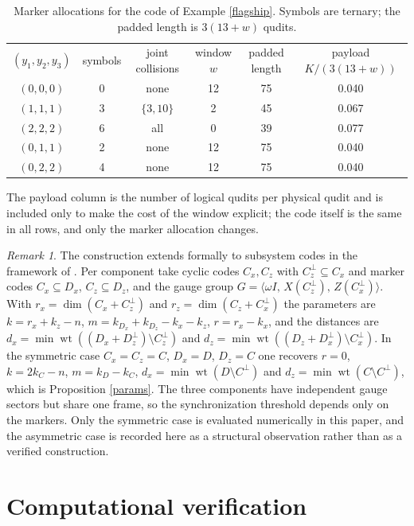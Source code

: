 \documentclass[11pt,reqno]{amsart}
\theoremstyle{definition}
\theoremstyle{remark}
\newtheorem{remark}[theorem]{Remark}
\newcommand{\wt}{\operatorname{wt}}
\newcommand{\gen}[1]{\langle #1\rangle}
\begin{document}
\begin{table}[t]
\centering
\caption{Marker allocations for the code of Example \ref{flagship}. Symbols are ternary; the padded length is $3(13+w)$ qudits.\label{tab:alloc}}
\small
\begin{tabular}{cccccc}
\toprule
$(y_1,y_2,y_3)$ & symbols & joint collisions & window $w$ & padded length & payload $K/(3(13+w))$ \\
$(0,0,0)$ & 0 & none & 12 & 75 & 0.040 \\
$(1,1,1)$ & 3 & $\{3,10\}$ & 2 & 45 & 0.067 \\
$(2,2,2)$ & 6 & all & 0 & 39 & 0.077 \\
$(0,1,1)$ & 2 & none & 12 & 75 & 0.040 \\
$(0,2,2)$ & 4 & none & 12 & 75 & 0.040 \\
\bottomrule
\end{tabular}

\smallskip
\parbox{\linewidth}{\footnotesize The payload column is the number of logical qudits per physical qudit and is included only to make the cost of the window explicit; the code itself is the same in all rows, and only the marker allocation changes.}
\end{table}

\begin{remark}\label{subsystem}
The construction extends formally to subsystem codes in the framework of \cite{TansuwannontNemec2026}. Per component take cyclic codes $C_x,C_z$ with $C_z^\perp\subseteq C_x$ and marker codes $C_x\subseteq D_x$, $C_z\subseteq D_z$, and the gauge group $G=\gen{\omega I,\,X(C_z^\perp),\,Z(C_x^\perp)}$. With $r_x=\dim(C_x+C_z^\perp)$ and $r_z=\dim(C_z+C_x^\perp)$ the parameters are $k=r_x+k_z-n$, $m=k_{D_x}+k_{D_z}-k_x-k_z$, $r=r_x-k_x$, and the distances are $d_x=\min\wt((D_x+D_z^\perp)\setminus C_z^\perp)$ and $d_z=\min\wt((D_z+D_x^\perp)\setminus C_x^\perp)$. In the symmetric case $C_x=C_z=C$, $D_x=D$, $D_z=C$ one recovers $r=0$, $k=2k_C-n$, $m=k_D-k_C$, $d_x=\min\wt(D\setminus C^\perp)$ and $d_z=\min\wt(C\setminus C^\perp)$, which is Proposition \ref{params}. The three components have independent gauge sectors but share one frame, so the synchronization threshold depends only on the markers. Only the symmetric case is evaluated numerically in this paper, and the asymmetric case is recorded here as a structural observation rather than as a verified construction.
\end{remark}

\section{Computational verification}\label{sec:computational-verification}
\end{document}
